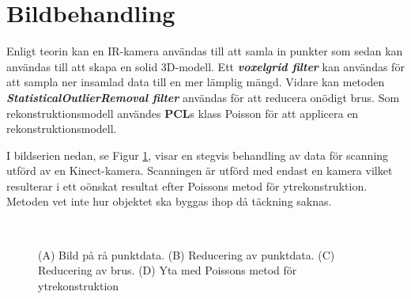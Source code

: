\documentclass[a4paper,12pt,oneside,final]{extbook}
\begin{document}
\newpage
\section{Bildbehandling}
Enligt teorin kan en IR-kamera användas till att samla in punkter som sedan kan användas till att skapa en solid 3D-modell. Ett \emph\textbf{{voxelgrid filter}} kan användas för att sampla ner insamlad data till en mer lämplig mängd. Vidare kan metoden \emph\textbf{{StatisticalOutlierRemoval filter}} användas för att reducera onödigt brus. Som rekonstruktionsmodell användes \textbf{PCL}s klass Poisson för att applicera en rekonstruktionsmodell.

I bildserien nedan, se Figur \ref{fig:scans}, visar en stegvis behandling av data för scanning utförd av en Kinect-kamera. Scanningen är utförd med endast en kamera vilket resulterar i ett oönskat resultat efter Poissons metod för ytrekonstruktion. Metoden vet inte hur objektet ska byggas ihop då täckning saknas.


\begin{figure}[H!]
\centering
\mbox{\quad
{}}
\mbox{\quad
{}}
\caption[Bilder från ytrekonstruktion]{(A) Bild på rå punktdata. (B) Reducering av punktdata. (C) Reducering av brus. (D) Yta med Poissons metod för ytrekonstruktion} \label{fig:scans}
\end{figure}
\end{document}
